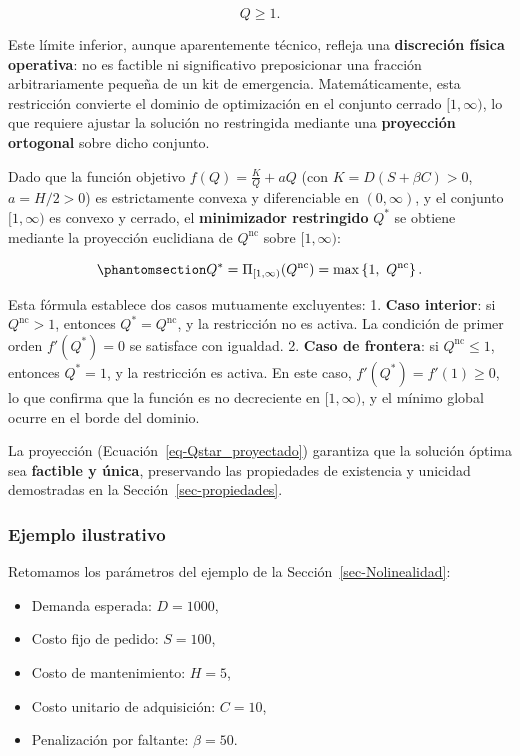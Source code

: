 \documentclass[
  spanish,
  us-letterpaper,
]{scrreprt}
\providecommand{\tightlist}{%
  \setlength{\itemsep}{0pt}\setlength{\parskip}{0pt}}
\numberwithin{equation}{section}
\begin{document}
\[
Q \geq 1.
\]

Este límite inferior, aunque aparentemente técnico, refleja una
\textbf{discreción física operativa}: no es factible ni significativo
preposicionar una fracción arbitrariamente pequeña de un kit de
emergencia. Matemáticamente, esta restricción convierte el dominio de
optimización en el conjunto cerrado \([1, \infty)\), lo que requiere
ajustar la solución no restringida mediante una \textbf{proyección
ortogonal} sobre dicho conjunto.

Dado que la función objetivo \(f(Q) = \frac{K}{Q} + a Q\) (con
\(K = D(S + \beta C) > 0\), \(a = H/2 > 0\)) es estrictamente convexa y
diferenciable en \((0, \infty)\), y el conjunto \([1, \infty)\) es
convexo y cerrado, el \textbf{minimizador restringido} \(Q^*\) se
obtiene mediante la proyección euclidiana de \(Q^{\text{nc}}\) sobre
\([1, \infty)\):

\begin{equation}\phantomsection\label{eq-Qstar_proyectado}{
Q^* = \Pi_{[1, \infty)}(Q^{\text{nc}}) = \max\left\{ 1,\ Q^{\text{nc}} \right\}.
}\end{equation}

Esta fórmula establece dos casos mutuamente excluyentes: 1. \textbf{Caso
interior}: si \(Q^{\text{nc}} > 1\), entonces \(Q^* = Q^{\text{nc}}\), y
la restricción no es activa. La condición de primer orden
\(f'(Q^*) = 0\) se satisface con igualdad. 2. \textbf{Caso de frontera}:
si \(Q^{\text{nc}} \leq 1\), entonces \(Q^* = 1\), y la restricción es
activa. En este caso, \(f'(Q^*) = f'(1) \geq 0\), lo que confirma que la
función es no decreciente en \([1, \infty)\), y el mínimo global ocurre
en el borde del dominio.

La proyección (Ecuación~\ref{eq-Qstar_proyectado}) garantiza que la
solución óptima sea \textbf{factible y única}, preservando las
propiedades de existencia y unicidad demostradas en la
Sección~\ref{sec-propiedades}.

\subsubsection{Ejemplo ilustrativo}\label{ejemplo-ilustrativo-7}

Retomamos los parámetros del ejemplo de la
Sección~\ref{sec-Nolinealidad}:

\begin{itemize}
\tightlist
\item
  Demanda esperada: \(D = 1000\),
\item
  Costo fijo de pedido: \(S = 100\),
\item
  Costo de mantenimiento: \(H = 5\),
\item
  Costo unitario de adquisición: \(C = 10\),
\item
  Penalización por faltante: \(\beta = 50\).
\end{itemize}
\end{document}
